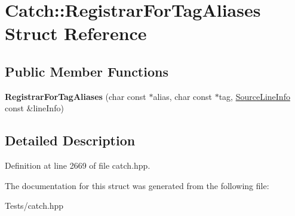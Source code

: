 \hypertarget{struct_catch_1_1_registrar_for_tag_aliases}{}\section{Catch\+:\+:Registrar\+For\+Tag\+Aliases Struct Reference}
\label{struct_catch_1_1_registrar_for_tag_aliases}
\subsection*{Public Member Functions}
\begin{DoxyCompactItemize}
\item 
\mbox{\label{struct_catch_1_1_registrar_for_tag_aliases_ae4e45830e4763bcd65d55d8db9167b69}} 
{\bfseries Registrar\+For\+Tag\+Aliases} (char const $\ast$alias, char const $\ast$tag, \hyperlink{struct_catch_1_1_source_line_info}{Source\+Line\+Info} const \&line\+Info)
\end{DoxyCompactItemize}


\subsection{Detailed Description}


Definition at line 2669 of file catch.\+hpp.



The documentation for this struct was generated from the following file\+:\begin{DoxyCompactItemize}
\item 
Tests/catch.\+hpp\end{DoxyCompactItemize}
